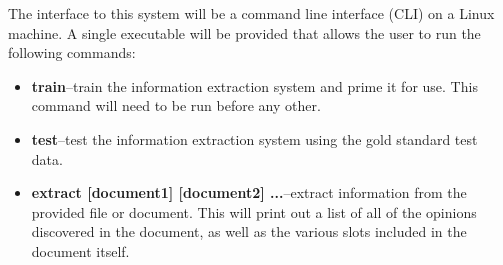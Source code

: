 \documentclass{article}
\begin{document}
    The interface to this system will be a command line interface (CLI) on a Linux machine. A single executable will be provided that allows the user to run the following commands:

    \begin{itemize}
    	\item \textbf{train}--train the information extraction system and prime it for use. This command will need to be run before any other.
        \item \textbf{test}--test the information extraction system using the gold standard test data.
        \item \textbf{extract \textnormal{[document1] [document2] ...}}--extract information from the provided file or document. This will print out a list of all of the opinions discovered in the document, as well as the various slots included in the document itself.
    \end{itemize}

\end{document}
